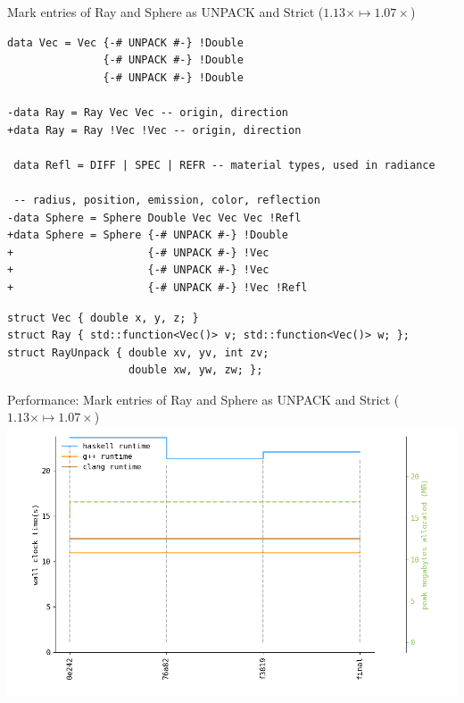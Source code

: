 \documentclass[8pt]{beamer}
\begin{document}
\begin{frame}[fragile]{Mark entries of Ray and Sphere as UNPACK and Strict ($1.13 \times \mapsto 1.07\times$)}

\begin{verbatim}
data Vec = Vec {-# UNPACK #-} !Double 
               {-# UNPACK #-} !Double 
               {-# UNPACK #-} !Double

-data Ray = Ray Vec Vec -- origin, direction
+data Ray = Ray !Vec !Vec -- origin, direction

 data Refl = DIFF | SPEC | REFR -- material types, used in radiance

 -- radius, position, emission, color, reflection
-data Sphere = Sphere Double Vec Vec Vec !Refl
+data Sphere = Sphere {-# UNPACK #-} !Double 
+                     {-# UNPACK #-} !Vec 
+                     {-# UNPACK #-} !Vec 
+                     {-# UNPACK #-} !Vec !Refl
\end{verbatim}

\begin{verbatim}
struct Vec { double x, y, z; }
struct Ray { std::function<Vec()> v; std::function<Vec()> w; };
struct RayUnpack { double xv, yv, int zv;
                   double xw, yw, zw; };
\end{verbatim}

\end{frame}

\begin{frame}[fragile]{Performance: Mark entries of Ray and Sphere as UNPACK and Strict ($1.13 \times \mapsto 1.07\times$)}
\includegraphics[height=0.6\textwidth]{perfdata-upto-f3819-gen.png}
\end{frame}
\end{document}
